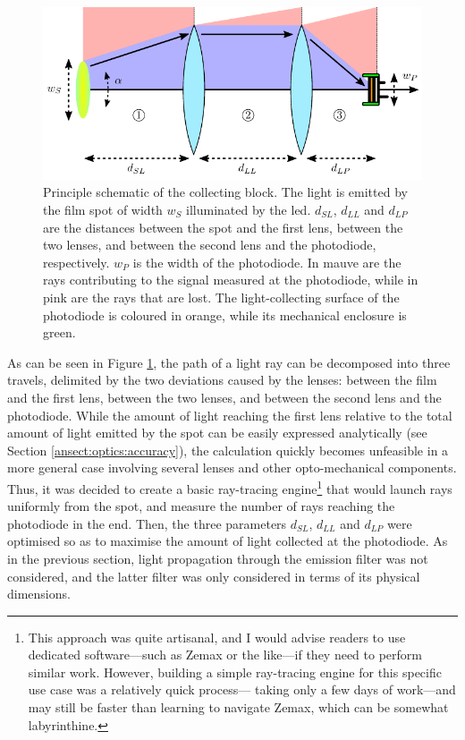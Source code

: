 \begin{figure}
	\centering
	\includegraphics{2_appendices/optical_figures/collecting_th_converted.pdf}
	\caption[Principle schematic of the collecting block.]{Principle schematic of the collecting block. The light is emitted by the film spot of width $w_S$ illuminated by the \gls{led}. $d_{SL}$, $d_{LL}$ and $d_{LP}$ are the distances between the spot and the first lens, between the two lenses, and between the second lens and the photodiode, respectively. $w_P$ is the width of the photodiode. In mauve are the rays contributing to the signal measured at the photodiode, while in pink are the rays that are lost. The light-collecting surface of the photodiode is coloured in orange, while its mechanical enclosure is green.}
	\label{anfig:optics:collecting_th}
\end{figure}

As can be seen in Figure \ref{anfig:optics:collecting_th}, the path of a light ray can be decomposed into three travels, delimited by the two deviations caused by the lenses:  between the film and the first lens,  between the two lenses, and  between the second lens and the photodiode. While the amount of light reaching the first lens relative to the total amount of light emitted by the spot can be easily expressed analytically (see Section \ref{ansect:optics:accuracy}), the calculation quickly becomes unfeasible in a more general case involving several lenses and other opto-mechanical components. Thus, it was decided to create a basic ray-tracing engine\footnote{This approach was quite artisanal, and I would advise readers to use dedicated software---such as Zemax or the like---if they need to perform similar work. However, building a simple ray-tracing engine for this specific use case was a relatively quick process---\ie{} taking only a few days of work---and may still be faster than learning to navigate Zemax, which can be somewhat labyrinthine.} that would launch rays uniformly from the spot, and measure the number of rays reaching the photodiode in the end. Then, the three parameters $d_{SL}$, $d_{LL}$ and $d_{LP}$ were optimised so as to maximise the amount of light collected at the photodiode. As in the previous section, light propagation through the emission filter was not considered, and the latter filter was only considered in terms of its physical dimensions.

